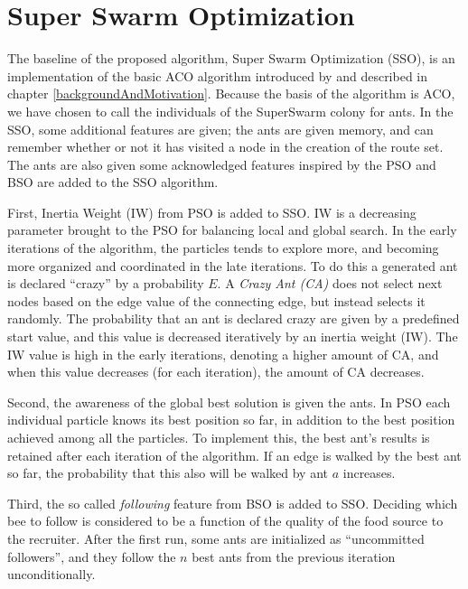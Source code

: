 \section{Super Swarm Optimization}

The baseline of the proposed algorithm, Super Swarm Optimization (SSO), is an implementation of the basic ACO algorithm introduced by \citet{nanda11} and described in chapter \vref{backgroundAndMotivation}. Because the basis of the algorithm is ACO, we have chosen to call the individuals of the SuperSwarm colony for ants. %
In the SSO, some additional features are given; the ants are given memory, and can remember whether or not it has visited a node in the creation of the route set. The ants are also given some acknowledged features inspired by the PSO and BSO are added to the SSO algorithm.

First, Inertia Weight (IW) from PSO is added to SSO. IW is a decreasing parameter brought to the PSO for balancing local and global search. In the early iterations of the algorithm, the particles tends to explore more, and becoming more organized and coordinated in the late iterations. To do this a generated ant is declared ``crazy'' by a probability $E$. A \textit{Crazy Ant (CA)} does not select next nodes based on the edge value of the connecting edge, but instead selects it randomly. The probability that an ant is declared crazy are given by a predefined start value, and this value is decreased iteratively by an inertia weight (IW). The IW value is high in the early iterations, denoting a higher amount of CA, and when this value decreases (for each iteration), the amount of CA decreases. 

Second, the awareness of the global best solution is given the ants. In PSO each individual particle knows its best position so far, in addition to the best position achieved among all the particles. To implement this, the best ant's results is retained after each iteration of the algorithm. If an edge is walked by the best ant so far, the probability that this also will be walked by ant $a$ increases.

Third, the so called \textit{following} feature from BSO is added to SSO. Deciding which bee to follow is considered to be a function of the quality of the food source to the recruiter. After the first run, some ants are initialized as ``uncommitted followers'', and they follow the $n$ best ants from the previous iteration unconditionally. 

